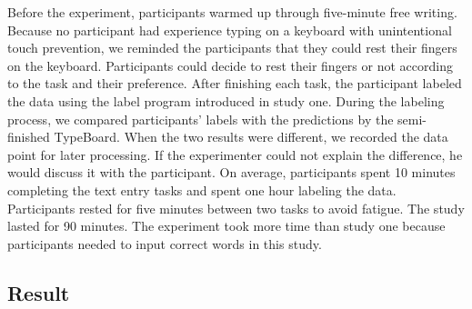 Before the experiment, participants warmed up through five-minute free writing. Because no participant had experience typing on a keyboard with unintentional touch prevention, we reminded the participants that they could rest their fingers on the keyboard. Participants could decide to rest their fingers or not according to the task and their preference.
After finishing each task, the participant labeled the data using the label program introduced in study one. During the labeling process, we compared participants' labels with the predictions by the semi-finished TypeBoard. When the two results were different, we recorded the data point for later processing. If the experimenter could not explain the difference, he would discuss it with the participant.
On average, participants spent 10 minutes completing the text entry tasks and spent one hour labeling the data. Participants rested for five minutes between two tasks to avoid fatigue. The study lasted for 90 minutes. The experiment took more time than study one because participants needed to input correct words in this study.



\subsection{Result}


